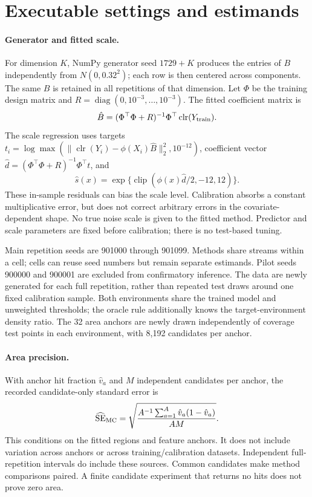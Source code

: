 \section{Executable settings and estimands}
\label{app:details}
\paragraph{Generator and fitted scale.}
For dimension $K$, NumPy generator seed $1729+K$ produces the entries of $B$ independently from $N(0,0.32^2)$; each row is then centered across components. The same $B$ is retained in all repetitions of that dimension. Let $\Phi$ be the training design matrix and $R=\operatorname{diag}(0,10^{-3},\ldots,10^{-3})$. The fitted coefficient matrix is
\begin{equation}
 \hat B=(\Phi^\top\Phi+R)^{-1}\Phi^\top\operatorname{clr}(Y_{\rm train}).
\end{equation}
The scale regression uses targets $t_i=\log\max(\|\operatorname{clr}(Y_i)-\phi(X_i)\hat B\|_2^2,10^{-12})$, coefficient vector $\hat d=(\Phi^\top\Phi+R)^{-1}\Phi^\top t$, and
\begin{equation}
 \hat s(x)=\exp\{\operatorname{clip}(\phi(x)\hat d/2,-12,12)\}.
\end{equation}
These in-sample residuals can bias the scale level. Calibration absorbs a constant multiplicative error, but does not correct arbitrary errors in the covariate-dependent shape. No true noise scale is given to the fitted method. Predictor and scale parameters are fixed before calibration; there is no test-based tuning.

Main repetition seeds are 901000 through 901099. Methods share streams within a cell; cells can reuse seed numbers but remain separate estimands. Pilot seeds 900000 and 900001 are excluded from confirmatory inference. The data are newly generated for each full repetition, rather than repeated test draws around one fixed calibration sample. Both environments share the trained model and unweighted thresholds; the oracle rule additionally knows the target-environment density ratio. The 32 area anchors are newly drawn independently of coverage test points in each environment, with 8,192 candidates per anchor.

\paragraph{Area precision.}
With anchor hit fraction $\hat v_a$ and $M$ independent candidates per anchor, the recorded candidate-only standard error is
\begin{equation}
 \widehat{\mathrm{SE}}_{\rm MC}
 =\sqrt{\frac{A^{-1}\sum_{a=1}^A\hat v_a(1-\hat v_a)}{AM}}.
\end{equation}
This conditions on the fitted regions and feature anchors. It does not include variation across anchors or across training/calibration datasets. Independent full-repetition intervals do include these sources. Common candidates make method comparisons paired. A finite candidate experiment that returns no hits does not prove zero area.

